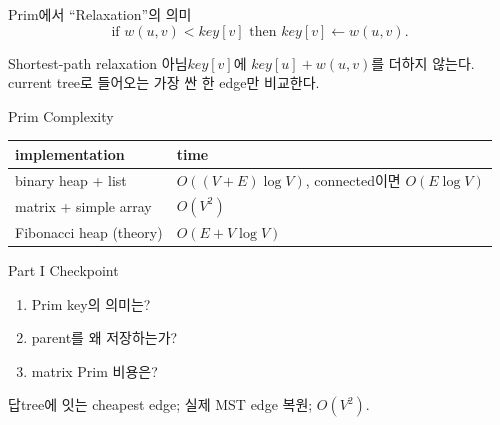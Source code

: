 \begin{frame}{Prim에서 “Relaxation”의 의미}
\[
\text{if }w(u,v)<key[v]\text{ then }key[v]\gets w(u,v).
\]
\begin{alertblock}{Shortest-path relaxation 아님}\(key[v]\)에 \(key[u]+w(u,v)\)를 더하지 않는다. current tree로 들어오는 가장 싼 한 edge만 비교한다.\end{alertblock}
\end{frame}
\begin{frame}{Prim Complexity}
\small\begin{tabular}{ll}\toprule
implementation&time\\\midrule
binary heap + list&\(O((V+E)\log V)\), connected이면 \(O(E\log V)\)\\
matrix + simple array&\(O(V^2)\)\\
Fibonacci heap (theory)&\(O(E+V\log V)\)\\\bottomrule
\end{tabular}
\end{frame}
\begin{frame}{Part I Checkpoint}
\begin{enumerate}\item Prim key의 의미는?\item parent를 왜 저장하는가?\item matrix Prim 비용은?\end{enumerate}
\begin{exampleblock}{답}tree에 잇는 cheapest edge; 실제 MST edge 복원; \(O(V^2)\).\end{exampleblock}
\end{frame}
